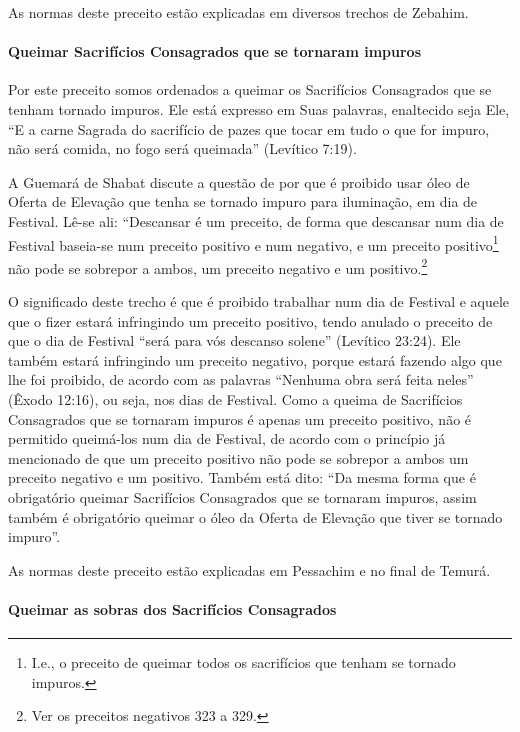 As normas deste preceito estão explicadas em diversos trechos de Zebahim.

\paragraph{Queimar Sacrifícios Consagrados que se tornaram impuros}

Por este preceito somos ordenados a queimar os Sacrifícios Consagrados
que se tenham tornado impuros. Ele está expresso em Suas palavras,
enaltecido seja Ele, ``E a carne Sagrada do sacrifício de pazes que
tocar em tudo o que for impuro, não será comida, no fogo será queimada''
(Levítico 7:19).

A Guemará de Shabat discute a questão de por que é proibido usar óleo de
Oferta de Elevação que tenha se tornado impuro para iluminação, em dia
de Festival. Lê-se ali: ``Descansar é um preceito, de forma que
descansar num dia de Festival baseia-se num preceito positivo e num negativo, e um
preceito positivo\footnote{I.e., o preceito de queimar todos os sacrifícios que tenham se tornado impuros.} não pode se sobrepor a ambos, um
preceito negativo e um positivo.\footnote{Ver os preceitos negativos 323 a 329.}

O significado deste trecho é que é proibido trabalhar num dia de
Festival e aquele que o fizer estará infringindo um preceito positivo,
tendo anulado o preceito de que o dia de Festival ``será para vós
descanso solene'' (Levítico 23:24). Ele também estará infringindo um
preceito negativo, porque estará fazendo algo que lhe foi proibido, de
acordo com as palavras ``Nenhuma obra será feita neles'' (Êxodo 12:16),
ou seja, nos dias de Festival. Como a queima de Sacrifícios Consagrados
que se tornaram impuros é apenas um preceito positivo, não é permitido
queimá-los num dia de Festival, de acordo com o princípio já mencionado
de que um preceito positivo não pode se sobrepor a ambos um preceito
negativo e um positivo. Também está dito: ``Da mesma forma que é
obrigatório queimar Sacrifícios Consagrados que se tornaram impuros,
assim também é obrigatório queimar o óleo da Oferta de Elevação que
tiver se tornado impuro''.

As normas deste preceito estão explicadas em Pessachim e no final de Temurá.

\paragraph{Queimar as sobras dos Sacrifícios Consagrados}

